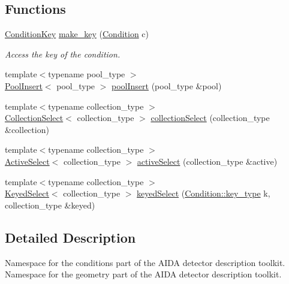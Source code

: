 \subsection*{Functions}
\begin{DoxyCompactItemize}
\item 
\hyperlink{class_d_d4hep_1_1_conditions_1_1_condition_key}{ConditionKey} \hyperlink{namespace_d_d4hep_1_1_conditions_a5d280367b77508df52c5caadc9d84abf}{make\_\-key} (\hyperlink{class_d_d4hep_1_1_conditions_1_1_condition}{Condition} c)
\begin{DoxyCompactList}\small\item\em Access the key of the condition. \item\end{DoxyCompactList}\item 
{\footnotesize template$<$typename pool\_\-type $>$ }\\\hyperlink{class_d_d4hep_1_1_conditions_1_1_pool_insert}{PoolInsert}$<$ pool\_\-type $>$ \hyperlink{namespace_d_d4hep_1_1_conditions_a23f0fbdfff63e698e4f151636b8c50d3}{poolInsert} (pool\_\-type \&pool)
\item 
{\footnotesize template$<$typename collection\_\-type $>$ }\\\hyperlink{class_d_d4hep_1_1_conditions_1_1_collection_select}{CollectionSelect}$<$ collection\_\-type $>$ \hyperlink{namespace_d_d4hep_1_1_conditions_ac4eddf0d558e808e29ad17431cac55df}{collectionSelect} (collection\_\-type \&collection)
\item 
{\footnotesize template$<$typename collection\_\-type $>$ }\\\hyperlink{class_d_d4hep_1_1_conditions_1_1_active_select}{ActiveSelect}$<$ collection\_\-type $>$ \hyperlink{namespace_d_d4hep_1_1_conditions_a652973a7652fc68f7f02011077546526}{activeSelect} (collection\_\-type \&active)
\item 
{\footnotesize template$<$typename collection\_\-type $>$ }\\\hyperlink{class_d_d4hep_1_1_conditions_1_1_keyed_select}{KeyedSelect}$<$ collection\_\-type $>$ \hyperlink{namespace_d_d4hep_1_1_conditions_a268ac177b8108ed7b8dbab4c4ba55499}{keyedSelect} (\hyperlink{class_d_d4hep_1_1_conditions_1_1_condition_a7528efa762e8cc072ef80ea67c3531f9}{Condition::key\_\-type} k, collection\_\-type \&keyed)
\end{DoxyCompactItemize}


\subsection{Detailed Description}
Namespace for the conditions part of the AIDA detector description toolkit. Namespace for the geometry part of the AIDA detector description toolkit. 

